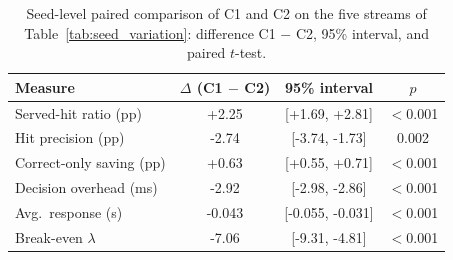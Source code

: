 \begin{table}[htbp]
\centering
\caption{Seed-level paired comparison of C1 and C2 on the five streams of Table~\ref{tab:seed_variation}: difference C1 $-$ C2, 95\% interval, and paired $t$-test.}
\label{tab:c1_c2_paired}
\footnotesize
\begin{tabular}{lccc}
\toprule
Measure & $\Delta$ (C1 $-$ C2) & 95\% interval & $p$ \\
\midrule
Served-hit ratio (pp) & +2.25 & [+1.69, +2.81] & $<$0.001 \\
Hit precision (pp) & -2.74 & [-3.74, -1.73] & 0.002 \\
Correct-only saving (pp) & +0.63 & [+0.55, +0.71] & $<$0.001 \\
Decision overhead (ms) & -2.92 & [-2.98, -2.86] & $<$0.001 \\
Avg.\ response (s) & -0.043 & [-0.055, -0.031] & $<$0.001 \\
Break-even $\lambda$ & -7.06 & [-9.31, -4.81] & $<$0.001 \\
\bottomrule
\end{tabular}
\end{table}

\begin{table}[htbp]
\centering
\caption{Sensitivity to workload composition: served-hit ratio / hit precision (\%), mean over three seeds. One generator parameter varies at a time from the default stream (Zipf exponent 1.1, duplicate rate 0.5, hard-negative rate 0.35).}
\label{tab:workload_sensitivity}
\end{table}

